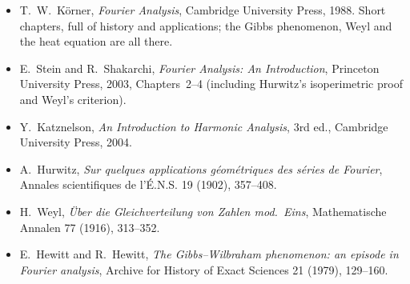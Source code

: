 \begin{itemize}
\item T.~W.~K\"orner, \emph{Fourier Analysis}, Cambridge University Press, 1988. Short chapters, full of history and
applications; the Gibbs phenomenon, Weyl and the heat equation are all there.
\item E.~Stein and R.~Shakarchi, \emph{Fourier Analysis: An Introduction}, Princeton University Press, 2003, Chapters~2--4
(including Hurwitz's isoperimetric proof and Weyl's criterion).
\item Y.~Katznelson, \emph{An Introduction to Harmonic Analysis}, 3rd ed., Cambridge University Press, 2004.
\item A.~Hurwitz, \emph{Sur quelques applications g\'eom\'etriques des s\'eries de Fourier}, Annales scientifiques de l'\'E.N.S.
19 (1902), 357--408.
\item H.~Weyl, \emph{\"Uber die Gleichverteilung von Zahlen mod.~Eins}, Mathematische Annalen 77 (1916), 313--352.
\item E.~Hewitt and R.~Hewitt, \emph{The Gibbs--Wilbraham phenomenon: an episode in Fourier analysis}, Archive for History of
Exact Sciences 21 (1979), 129--160.
\end{itemize}
